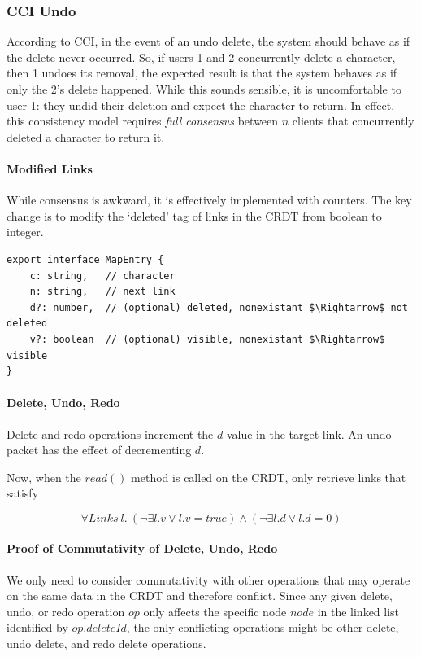 \documentclass[12pt,a4paper,twoside,openright]{report}
\begin{document}
		\subsubsection{CCI Undo} \label{sec:cciundo}
		According to CCI, in the event of an undo delete, the system should behave as if the delete never occurred. So, if users 1 and 2 concurrently delete a character, then 1 undoes its removal, the expected result is that the system behaves as if only the 2's delete happened. While this sounds sensible, it is uncomfortable to user 1: they undid their deletion and expect the character to return. In effect, this consistency model requires \textit{full consensus} between $n$ clients that concurrently deleted a character to return it.
		
			\paragraph{Modified Links}
			While consensus is awkward, it is effectively implemented with counters. The key change is to modify the `deleted' tag of links in the CRDT from boolean to integer.
			
\begin{lstlisting}[caption={New Type Signature of a Link in the CRDT}, mathescape=true]
export interface MapEntry {
	c: string,   // character
	n: string,   // next link
	d?: number,  // (optional) deleted, nonexistant $\Rightarrow$ not deleted
	v?: boolean  // (optional) visible, nonexistant $\Rightarrow$ visible
}
\end{lstlisting}

			\paragraph{Delete, Undo, Redo}
			Delete and redo operations increment the $d$ value in the target link. An undo packet has the effect of decrementing $d$.
			
			Now, when the $read()$ method is called on the CRDT, only retrieve links that satisfy
			
				\[\forall Links\ l.\  (\lnot\exists l.v \lor l.v = true) \land (\lnot\exists l.d \lor l.d = 0 ) \] 
			
			\paragraph{Proof of Commutativity of Delete, Undo, Redo}
			We only need to consider commutativity with other operations that may operate on the same data in the CRDT and therefore conflict. Since any given delete, undo, or redo operation $op$ only affects the specific node $node$ in the linked list identified by $op.deleteId$, the only conflicting operations might be other delete, undo delete, and redo delete operations.
			
\end{document}
